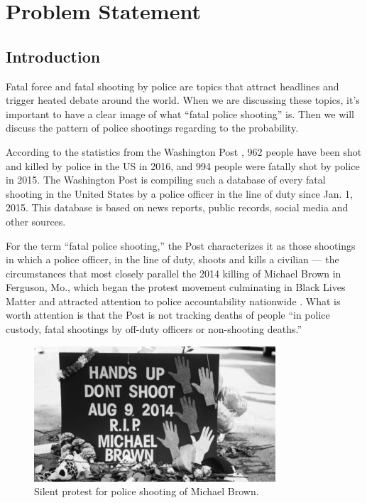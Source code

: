 \documentclass[conf]{new-aiaa}
\begin{document}
\newpage

\section{Problem Statement}

\subsection{Introduction}

Fatal force and fatal shooting by police are topics that attract headlines and trigger heated debate around the world. When we are discussing these topics, it's important to have a clear image of what ``fatal police shooting'' is. Then we will discuss the pattern of police shootings regarding to the probability. 

According to the statistics from the Washington Post \cite{washingtonpost}, 962 people have been shot and killed by police in the US in 2016, and 994 people were fatally shot by police in 2015. The Washington Post is compiling such a database of every fatal shooting in the United States by a police officer in the line of duty since Jan. 1, 2015. This database is based on news reports, public records, social media and other sources.

For the term ``fatal police shooting,'' the Post characterizes it as those shootings in which a police officer, in the line of duty, shoots and kills a civilian — the circumstances that most closely parallel the 2014 killing of Michael Brown in Ferguson, Mo., which began the protest movement culminating in Black Lives Matter and attracted attention to police accountability nationwide \cite{questia}. What is worth attention is that the Post is not tracking deaths of people ``in police custody, fatal shootings by off-duty officers or non-shooting deaths.''

\begin{figure}[H]
	\centering
	\includegraphics[width=0.7\linewidth]{intro.png}  
	\caption{Silent protest for police shooting of Michael Brown.}  
\end{figure}
\end{document}
